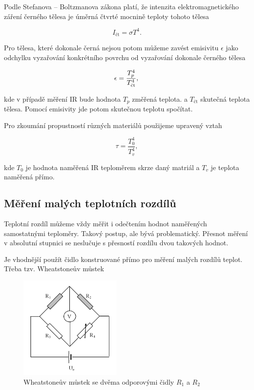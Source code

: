 \documentclass[a4paper,11pt]{article}
\begin{document}
Podle Stefanova – Boltzmanova zákona platí, že intenzita elektromagnetického záření černého tělesa je úměrná čtvrté mocnině teploty tohoto tělesa

\begin{equation}
  I_{\text{čt}} = \sigma T^4.
\end{equation}

\noindent
Pro tělesa, které dokonale černá nejsou potom můžeme zavést emisivitu $\epsilon$ jako
odchylku vyzařování konkrétního povrchu od vyzařování dokonale černého tělesa

\begin{equation}
  \epsilon = \frac{T_p^4}{T_{\text{čt}}^4}, \\
\end{equation}

\noindent
kde v případě měření IR bude hodnota $T_p$ změřená teplota. a $T_{\text{čt}}$ skutečná teplota tělesa. Pomocí emisivity jde potom skutečnou teplotu spočítat. 

Pro zkoumání propustností různých materiálů použijeme upravený vztah

\begin{equation}
\tau = \frac{T_0^4}{T_v^4},
\end{equation}

\noindent
kde $T_0$ je hodnota naměřená IR teploměrem skrze daný matriál a $T_v$ je teplota naměřená přímo.

\newpage

\subsection{Měření malých teplotních rozdílů}

Teplotní rozdíl můžeme vždy měřit i odečtením hodnot naměřených samostatnými teploměry. 
Takový postup, ale bývá problematický. Přesnot měření v absolutní stupnici se neslučuje s přesností rozdílu dvou takových hodnot.

Je vhodnější použít čidlo konstruované přímo pro měření malých rozdílů teplot. Třeba tzv. Wheatstoneův můstek 

\begin{figure}[ht]
  \centering
  \includegraphics[width=0.45\textwidth]{mustek_diagram.png}
  \caption{Wheatstoneův můstek se dvěma odporovými čidly $R_1$ a $R_2$}
\end{figure}
\end{document}
